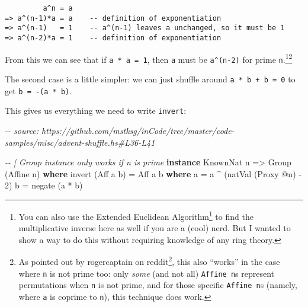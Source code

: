 \documentclass[]{article}
\newenvironment{Shaded}{}{}
\newcommand{\CommentTok}[1]{\textcolor[rgb]{0.38,0.63,0.69}{\textit{#1}}}
\newcommand{\DataTypeTok}[1]{\textcolor[rgb]{0.56,0.13,0.00}{#1}}
\newcommand{\DecValTok}[1]{\textcolor[rgb]{0.25,0.63,0.44}{#1}}
\newcommand{\FunctionTok}[1]{\textcolor[rgb]{0.02,0.16,0.49}{#1}}
\newcommand{\KeywordTok}[1]{\textcolor[rgb]{0.00,0.44,0.13}{\textbf{#1}}}
\newcommand{\NormalTok}[1]{#1}
\newcommand{\OperatorTok}[1]{\textcolor[rgb]{0.40,0.40,0.40}{#1}}
\newcommand{\OtherTok}[1]{\textcolor[rgb]{0.00,0.44,0.13}{#1}}
\renewcommand{\href}[2]{#2\footnote{\url{#1}}}
\begin{document}
\begin{verbatim}
         a^n = a
=> a^(n-1)*a = a    -- definition of exponentiation
=> a^(n-1)   = 1    -- a^(n-1) leaves a unchanged, so it must be 1
=> a^(n-2)*a = 1    -- definition of exponentiation
\end{verbatim}

From this we can see that if \texttt{a\textquotesingle{}\ *\ a\ =\ 1}, then
\texttt{a\textquotesingle{}} must be \texttt{a\^{}(n-2)} for prime
\texttt{n}.\footnote{You can also use the
  \href{https://en.wikipedia.org/wiki/Extended_Euclidean_algorithm}{Extended
  Euclidean Algorithm} to find the multiplicative inverse here as well if you
  are a (cool) nerd. But I wanted to show a way to do this without requiring
  knowledge of any ring theory.}\footnote{As
  \href{https://www.reddit.com/r/haskell/comments/jwl93i/shuffling_things_up_solving_advent_of_code_with/gct4ihy/?context=3}{pointed
  out by rogercaptain on reddit}, this also ``works'' in the case where
  \texttt{n} is not prime too: only \emph{some} (and not all)
  \texttt{Affine\ n}s represent permutations when \texttt{n} is not prime, and
  for those specific \texttt{Affine\ n}s (namely, where \texttt{a} is coprime to
  \texttt{n}), this technique does work.}

The second case is a little simpler: we can just shuffle around
\texttt{a\textquotesingle{}\ *\ b\ +\ b\textquotesingle{}\ =\ 0} to get
\texttt{b\textquotesingle{}\ =\ -(a\textquotesingle{}\ *\ b)}.

This gives us everything we need to write \texttt{invert}:

\begin{Shaded}
\begin{Highlighting}[]
\CommentTok{{-}{-} source: https://github.com/mstksg/inCode/tree/master/code{-}samples/misc/advent{-}shuffle.hs\#L36{-}L41}

\CommentTok{{-}{-} | Group instance only works if n is prime}
\KeywordTok{instance} \DataTypeTok{KnownNat}\NormalTok{ n }\OtherTok{=\textgreater{}} \DataTypeTok{Group}\NormalTok{ (}\DataTypeTok{Affine}\NormalTok{ n) }\KeywordTok{where}
\NormalTok{    invert (}\DataTypeTok{Aff}\NormalTok{ a b) }\OtherTok{=} \DataTypeTok{Aff}\NormalTok{ a\textquotesingle{} b\textquotesingle{}}
      \KeywordTok{where}
\NormalTok{        a\textquotesingle{} }\OtherTok{=}\NormalTok{ a }\OperatorTok{\^{}}\NormalTok{ (natVal (}\DataTypeTok{Proxy} \OperatorTok{@}\NormalTok{n) }\OperatorTok{{-}} \DecValTok{2}\NormalTok{)}
\NormalTok{        b\textquotesingle{} }\OtherTok{=} \FunctionTok{negate}\NormalTok{ (a\textquotesingle{} }\OperatorTok{*}\NormalTok{ b)}
\end{Highlighting}
\end{Shaded}
\end{document}
